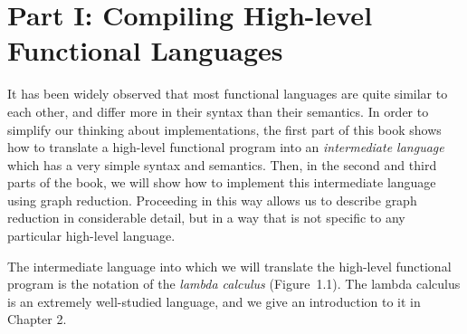 \section{Part I: Compiling High-level Functional Languages}
It has been widely observed that most functional languages are quite similar to
each other, and differ more in their syntax than their semantics. In order to
simplify our thinking about implementations, the first part of this book shows
how to translate a high-level functional program into an \textit{intermediate language}
which has a very simple syntax and semantics. Then, in the second and third
parts of the book, we will show how to implement this intermediate language
using graph reduction. Proceeding in this way allows us to describe graph
reduction in considerable detail, but in a way that is not specific to any
particular high-level language.

The intermediate language into which we will translate the high-level
functional program is the notation of the \textit{lambda calculus} (Figure~1.1). The
lambda calculus is an extremely well-studied language, and we give an introduction
to it in Chapter 2.





